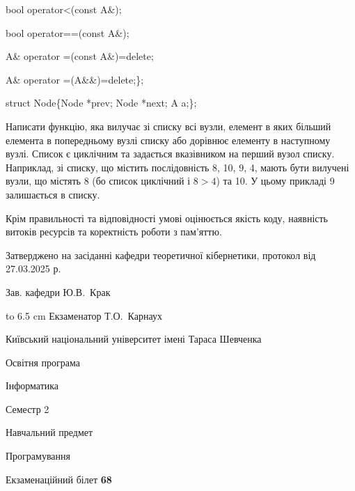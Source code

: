 \documentclass[12pt, ukrainian]{article}
\begin{document}
{\quad  bool operator<(const A\&); 

\quad  bool operator==(const A\&); 

\quad A\& operator =(const A\&)=delete; 

\quad  A\& operator =(A\&\&)=delete;\};

struct Node\{Node *prev; Node *next; A a;\};

Написати функцію, яка вилучає зі списку всі вузли, елемент в яких більший елемента в попередньому вузлі списку або дорівнює елементу в наступному вузлі. Список є циклічним та задається вказівником на перший вузол списку. Наприклад, зі списку, що містить послідовність 8, 10, 9, 4, мають бути вилучені вузли, що містять 8 (бо список циклічний і $8>4$) та 10. У цьому прикладі 9 залишається в списку.

Крім правильності та відповідності умові оцінюється якість коду, наявність витоків ресурсів та коректність роботи з пам'яттю. 

}
{\smallskip\smallskip \begin {scriptsize} Затверджено на засіданні кафедри теоретичної кібернетики, протокол   від   27.03.2025 р.\par\smallskip\smallskip\smallskip\smallskip
{\parbox {6.5 cm} {Зав. кафедри \dotfill Ю.В.~Крак}}\hspace {0.7cm} {\hbox to 6.5 cm { Екзаменатор \dotfill Т.О.~Карнаух}} \end{scriptsize}}
\newpage
{{\begin {scriptsize}\par
{ \center  Київський національний університет імені Тараса Шевченка \par}
{\parbox {5 cm}{Освітня програма \hfill}{\parbox {7 cm}{Інформатика\hfill}}\parbox {6 cm}{\hfill Семестр 2}}\par
{\parbox {5 cm} {Навчальний предмет \hfill}\parbox {7 cm}{Програмування \hfill}\parbox {6cm}{\hfill}\par}\vspace{-15pt} \end{scriptsize}}{\center Екзаменаційний білет \No \textbf { 68 }\par}}
\end{document}
